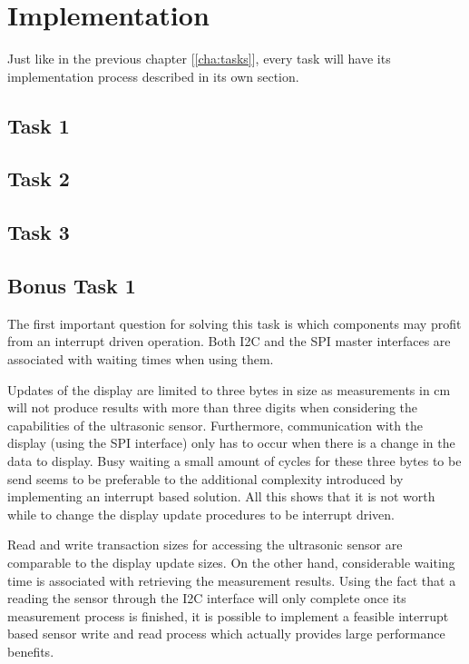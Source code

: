 \chapter{Implementation} %
\label{cha:impl}
	Just like in the previous chapter [\ref{cha:tasks}], every task will have its implementation process described in its own section.

	\section{Task 1} %
	\label{sec:impl_task_1}
		

	\section{Task 2} %
	\label{sec:impl_task_2}
		

	\section{Task 3} %
	\label{sec:impl_task_3}
		

	\section{Bonus Task 1} %
	\label{sec:impl_bonus_task_1}
		The first important question for solving this task is which components may profit from an interrupt driven operation. Both I2C and the SPI master interfaces are associated with waiting times when using them. 

		Updates of the display are limited to three bytes in size as measurements in cm will not produce results with more than three digits when considering the capabilities of the ultrasonic sensor. Furthermore, communication with the display (using the SPI interface) only has to occur when there is a change in the data to display. Busy waiting a small amount of cycles for these three bytes to be send seems to be preferable to the additional complexity introduced by implementing an interrupt based solution.
		All this shows that it is not worth while to change the display update procedures to be interrupt driven.

		Read and write transaction sizes for accessing the ultrasonic sensor are comparable to the display update sizes. On the other hand, considerable waiting time is associated with retrieving the measurement results. Using the fact that a reading the sensor through the I2C interface will only complete once its measurement process is finished, it is possible to implement a feasible interrupt based sensor write and read process which actually provides large performance benefits.

